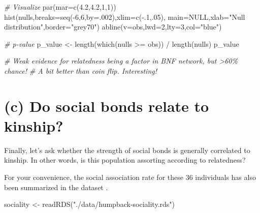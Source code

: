 \documentclass[
]{book}
\newenvironment{Shaded}{\begin{snugshade}}{\end{snugshade}}
\newcommand{\AttributeTok}[1]{\textcolor[rgb]{0.77,0.63,0.00}{#1}}
\newcommand{\CommentTok}[1]{\textcolor[rgb]{0.56,0.35,0.01}{\textit{#1}}}
\newcommand{\ConstantTok}[1]{\textcolor[rgb]{0.00,0.00,0.00}{#1}}
\newcommand{\DecValTok}[1]{\textcolor[rgb]{0.00,0.00,0.81}{#1}}
\newcommand{\FloatTok}[1]{\textcolor[rgb]{0.00,0.00,0.81}{#1}}
\newcommand{\FunctionTok}[1]{\textcolor[rgb]{0.00,0.00,0.00}{#1}}
\newcommand{\NormalTok}[1]{#1}
\newcommand{\OtherTok}[1]{\textcolor[rgb]{0.56,0.35,0.01}{#1}}
\newcommand{\SpecialCharTok}[1]{\textcolor[rgb]{0.00,0.00,0.00}{#1}}
\newcommand{\StringTok}[1]{\textcolor[rgb]{0.31,0.60,0.02}{#1}}
\begin{document}
\begin{Shaded}
\begin{Highlighting}[]
\CommentTok{\# Visualize}
\FunctionTok{par}\NormalTok{(}\AttributeTok{mar=}\FunctionTok{c}\NormalTok{(}\FloatTok{4.2}\NormalTok{,}\FloatTok{4.2}\NormalTok{,}\DecValTok{1}\NormalTok{,}\DecValTok{1}\NormalTok{))}
\FunctionTok{hist}\NormalTok{(nulls,}\AttributeTok{breaks=}\FunctionTok{seq}\NormalTok{(}\SpecialCharTok{{-}}\DecValTok{6}\NormalTok{,}\DecValTok{6}\NormalTok{,}\AttributeTok{by=}\NormalTok{.}\DecValTok{002}\NormalTok{),}\AttributeTok{xlim=}\FunctionTok{c}\NormalTok{(}\SpecialCharTok{{-}}\NormalTok{.}\DecValTok{1}\NormalTok{,.}\DecValTok{05}\NormalTok{),}
     \AttributeTok{main=}\ConstantTok{NULL}\NormalTok{,}\AttributeTok{xlab=}\StringTok{"Null distribution"}\NormalTok{,}\AttributeTok{border=}\StringTok{"grey70"}\NormalTok{)}
\FunctionTok{abline}\NormalTok{(}\AttributeTok{v=}\NormalTok{obs,}\AttributeTok{lwd=}\DecValTok{2}\NormalTok{,}\AttributeTok{lty=}\DecValTok{3}\NormalTok{,}\AttributeTok{col=}\StringTok{"blue"}\NormalTok{)}

\CommentTok{\# p{-}value}
\NormalTok{p\_value }\OtherTok{\textless{}{-}} \FunctionTok{length}\NormalTok{(}\FunctionTok{which}\NormalTok{(nulls }\SpecialCharTok{\textgreater{}=}\NormalTok{ obs)) }\SpecialCharTok{/} \FunctionTok{length}\NormalTok{(nulls)}
\NormalTok{p\_value}

\CommentTok{\# Weak evidence for relatedness being a factor in BNF network, but \textgreater{}60\% chance! }
\CommentTok{\# A bit better than coin flip. Interesting!}
\end{Highlighting}
\end{Shaded}

\hypertarget{c-do-social-bonds-relate-to-kinship}{%
\section*{(c) Do social bonds relate to kinship?}\label{c-do-social-bonds-relate-to-kinship}}

Finally, let's ask whether the strength of social bonds is generally correlated to kinship. In other words, is this population assorting according to relatedness?

For your convenience, the social association rate for these 36 individuals has also been summarized in the dataset .

\begin{Shaded}
\begin{Highlighting}[]
\NormalTok{sociality }\OtherTok{\textless{}{-}} \FunctionTok{readRDS}\NormalTok{(}\StringTok{"./data/humpback{-}sociality.rds"}\NormalTok{)}
\end{Highlighting}
\end{Shaded}
\end{document}
